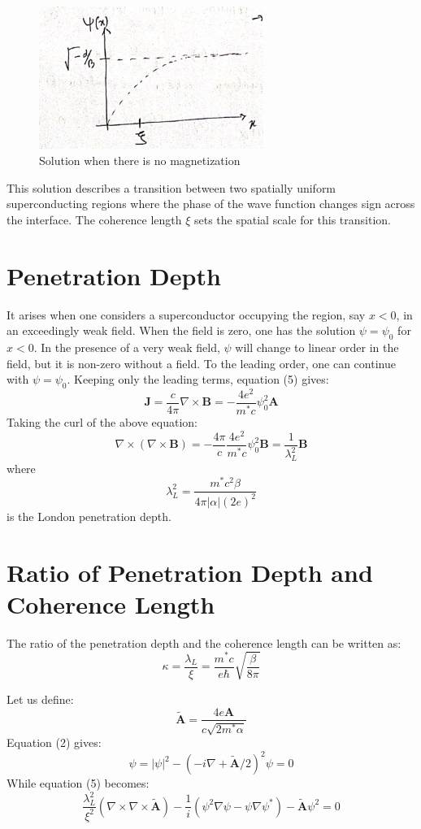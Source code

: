 \documentclass{article}
\begin{document}
\begin{figure}
    \begin{center}
        \includegraphics[width=0.65\textwidth]{figures/7.png}
    \end{center}
    \caption{Solution when there is no magnetization}\label{fig:}
\end{figure}


This solution describes a transition between two spatially uniform superconducting regions where the phase of the wave function changes sign across the interface. The coherence length $\xi$ sets the spatial scale for this transition.

\section{Penetration Depth}
It arises when one considers a superconductor occupying the region, say $x < 0$, in an exceedingly weak field. When the field is zero, one has the solution $\psi = \psi_0$ for $x < 0$. In the presence of a very weak field, $\psi$ will change to linear order in the field, but it is non-zero without a field. To the leading order, one can continue with $\psi = \psi_0$. Keeping only the leading terms, equation (5) gives:
\[
\mathbf{J} = \frac{c}{4\pi} \nabla \times \mathbf{B} = -\frac{4e^2}{m^* c} \psi_0^2 \mathbf{A} \tag{8}
\]
Taking the curl of the above equation:
\[
\nabla \times \left( \nabla \times \mathbf{B} \right) = -\frac{4\pi}{c} \frac{4e^2}{m^* c} \psi_0^2 \mathbf{B} = \frac{1}{\lambda_L^2} \mathbf{B} \tag{19}
\]
where
\[
\lambda_L^2 = \frac{m^* c^2 \beta}{4 \pi |\alpha| (2e)^2} \tag{20}
\]
is the London penetration depth.

\section{Ratio of Penetration Depth and Coherence Length}
The ratio of the penetration depth and the coherence length can be written as:
\[
\kappa = \frac{\lambda_L}{\xi} = \frac{m^* c}{e\hbar} \sqrt{\frac{\beta}{8\pi}} \tag{21}
\]

Let us define:
\[
\tilde{\mathbf{A}} = \frac{4e \mathbf{A}}{c \sqrt{2m^* \alpha}} \tag{22}
\]
Equation (2) gives:
\[
\psi = |\psi|^2 - \left( -i \nabla + \tilde{\mathbf{A}}/2 \right)^2 \psi = 0 \tag{23}
\]
While equation (5) becomes:
\[
\frac{\lambda_L^2}{\xi^2} \left( \nabla \times \nabla \times \tilde{\mathbf{A}} \right) - \frac{1}{i} \left( \psi^2 \nabla \psi - \psi \nabla \psi^* \right) - \tilde{\mathbf{A}} \psi^2 = 0 \tag{24}
\]
\end{document}
